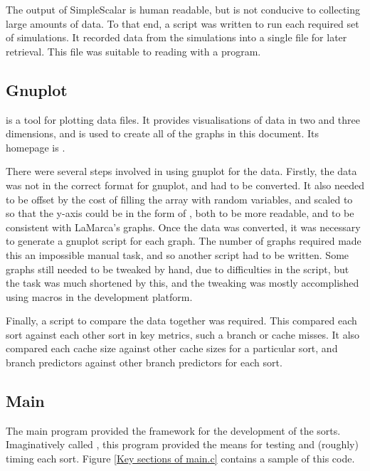 The output of SimpleScalar is human readable, but is not conducive to collecting
large amounts of data. To that end, a script was written to run each required
set of simulations. It recorded data from the simulations into a single file for
later retrieval. This file was suitable to reading with a  program.

\subsection{Gnuplot}
\label{Gnuplot}
 is a tool for plotting data files. It provides visualisations of
data in two and three dimensions, and is used to create all of the graphs in
this document. Its homepage is .

There were several steps involved in using gnuplot for the data. Firstly, the
data was not in the correct format for gnuplot, and had to be converted. It also
needed to be offset by the cost of filling the array with random variables, and
scaled to so that the y-axis could be in the form of ,
both to be more readable, and to be consistent with LaMarca's graphs. Once the
data was converted, it was necessary to generate a gnuplot script for each
graph.  The number of graphs required made this an impossible manual task, and
so another script had to be written.  Some graphs still needed to be tweaked by
hand, due to difficulties in the script, but the task was much shortened by
this, and the tweaking was mostly accomplished using macros in the development
platform.

Finally, a script to compare the data together was required.  This compared each
sort against each other sort in key metrics, such a branch or cache misses. It
also compared each cache size against other cache sizes for a particular sort,
and branch predictors against other branch predictors for each sort. 

\subsection{Main}
\label{Main}

The main program provided the framework for the development of the sorts.
Imaginatively called , this program provided the means for testing
and (roughly) timing each sort. Figure \vref{Key sections of main.c} contains a
sample of this code.


